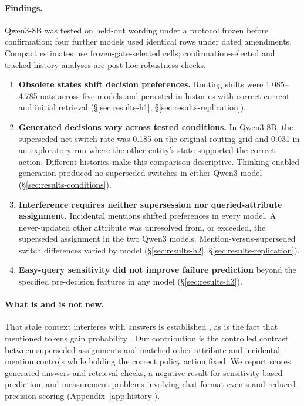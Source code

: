 \paragraph{Findings.} Qwen3-8B was tested on held-out wording under a protocol frozen before confirmation;
four further models used identical rows under dated amendments. Compact estimates use frozen-gate-selected
cells; confirmation-selected and tracked-history analyses are post hoc robustness checks.
\begin{enumerate}
  \item \textbf{Obsolete states shift decision preferences.} Routing shifts were 1.085--4.785 nats across
  five models and persisted in histories with correct current and initial retrieval
  (\S\ref{sec:results-h1}, \S\ref{sec:results-replication}).
  \item \textbf{Generated decisions vary across tested conditions.} In Qwen3-8B, the superseded net
  switch rate was 0.185 on the original routing grid and 0.031 in an exploratory run where the other
  entity's state supported the correct action. Different histories make this comparison descriptive.
  Thinking-enabled generation produced no superseded switches in either Qwen3 model
  (\S\ref{sec:results-conditions}).
  \item \textbf{Interference requires neither supersession nor queried-attribute assignment.} Incidental
  mentions shifted preferences in every model. A never-updated other attribute was unresolved from, or
  exceeded, the superseded assignment in the two Qwen3 models. Mention-versus-superseded switch
  differences varied by model (\S\ref{sec:results-h2}, \S\ref{sec:results-replication}).
  \item \textbf{Easy-query sensitivity did not improve failure prediction} beyond the specified
  pre-decision features in any model (\S\ref{sec:results-h3}).
\end{enumerate}

\paragraph{What is and is not new.} That stale context interferes with answers is established
\citep{wang2026unable,guo2026context,qian2026forget,chao2026stale}, as is the fact that mentioned tokens
gain probability \citep{niu2025entrainment}. Our contribution is the controlled contrast between superseded assignments and matched
other-attribute and incidental-mention controls while holding the correct policy action fixed. We report scores, generated answers and retrieval checks, a negative result for
sensitivity-based prediction, and measurement problems involving chat-format events and reduced-precision
scoring (Appendix~\ref{app:history}).

